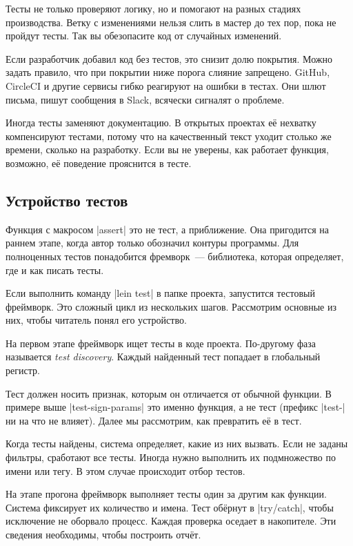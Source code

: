 
Тесты не только проверяют логику, но и помогают на разных стадиях
производства. Ветку с изменениями нельзя слить в мастер до тех пор, пока не
пройдут тесты. Так вы обезопасите код от случайных изменений.

Если разработчик добавил код без тестов, это снизит долю покрытия. Можно задать
правило, что при покрытии ниже порога слияние запрещено. GitHub, CircleCI и
другие сервисы гибко реагируют на ошибки в тестах. Они шлют письма, пишут
сообщения в Slack, всячески сигналят о проблеме.

Иногда тесты заменяют документацию. В открытых проектах её нехватку
компенсируют тестами, потому что на качественный текст уходит столько же
времени, сколько на разработку. Если вы не уверены, как работает функция,
возможно, её поведение прояснится в тесте.

\subsection{Устройство тестов}


Функция с макросом \spverb|assert| это не тест, а приближение. Она пригодится на
раннем этапе, когда автор только обозначил контуры программы. Для полноценных
тестов понадобится фремворк~--- библиотека, которая определяет, где и как писать
тесты.

Если выполнить команду \spverb|lein test| в папке проекта, запустится тестовый
фреймворк. Это сложный цикл из нескольких шагов. Рассмотрим основные из них,
чтобы читатель понял его устройство.

На первом этапе фреймворк ищет тесты в коде проекта. По-другому фаза называется
\emph{test discovery}. Каждый найденный тест попадает в глобальный регистр.

Тест должен носить признак, которым он отличается от обычной функции. В примере
выше \spverb|test-sign-params| это именно функция, а не тест (префикс
\spverb|test-| ни на что не влияет). Далее мы рассмотрим, как превратить её в
тест.

Когда тесты найдены, система определяет, какие из них вызвать. Если не заданы
фильтры, сработают все тесты. Иногда нужно выполнить их подмножество по имени
или тегу. В этом случае происходит отбор тестов.

На этапе прогона фреймворк выполняет тесты один за другим как функции. Система
фиксирует их количество и имена. Тест обёрнут в \spverb|try/catch|, чтобы
исключение не оборвало процесс. Каждая проверка оседает в накопителе. Эти
сведения необходимы, чтобы построить отчёт.

